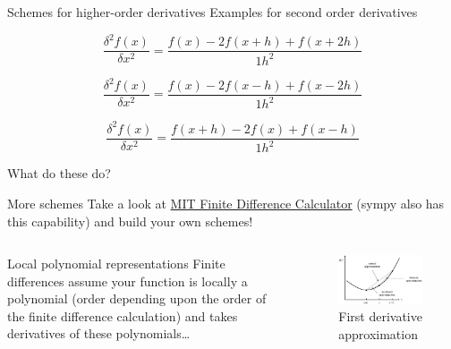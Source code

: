 \documentclass[presentation]{beamer}
\begin{document}
\begin{frame}[label={sec:org248e4c1}]{Schemes for higher-order derivatives}
Examples for second order derivatives
\begin{example}
\[ \frac{\delta^2 f(x)}{\delta x^2} = \frac{f(x)-2f(x+h)+f(x+2h)}{1h^{2}} \]
\end{example}
\begin{example}
\[ \frac{\delta^2 f(x)}{\delta x^2} = \frac{f(x)-2f(x-h)+f(x-2h)}{1h^{2}} \]
\end{example}
\begin{example}
\[ \frac{\delta^2 f(x)}{\delta x^2} = \frac{f(x+h)-2f(x)+f(x-h)}{1h^{2}} \]
\end{example}
\end{frame}
\begin{frame}[label={sec:orgc98cbce}]{What do these do?}
\begin{block}{More schemes}
Take a look at \href{http://web.media.mit.edu/\~crtaylor/calculator.html}{MIT Finite Difference Calculator} (sympy also has this
capability) and build your own schemes!
\end{block}
\begin{columns}
\begin{column}{0.6\columnwidth}
\begin{block}{Local polynomial representations}
Finite differences assume your function is locally a polynomial (order
depending upon the order of the finite difference calculation) and takes
derivatives of these polynomials\ldots{}
\end{block}
\end{column}
\begin{column}{0.5\columnwidth}
\begin{figure}[htbp]
\centering
\includegraphics[width=1.0\textwidth]{images/fdiff.jpg}
\caption{First derivative approximation}
\end{figure}
\end{column}
\end{columns}
\end{frame}
\end{document}
